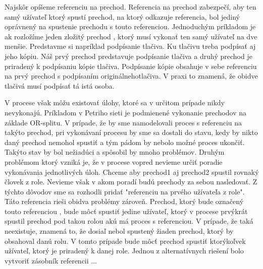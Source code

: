 Najskôr opíšeme referenciu na prechod. Referencia na prechod zabezpečí, aby ten samý užívateľ ktorý spustí prechod, na ktorý odkazuje referencia, bol jediný oprávnený na spustenie prechodu s touto referenciou. Jednoduchým príkladom je ak rozložíme jeden zložitý prechod , ktorý musí vykonať ten samý užívateľ na dve menšie. Predstavme si napríklad podpísanie tlačiva. Ku tlačivu treba podpísať aj jeho kópiu. Náš prvý prechod predstavuje podpísanie tlačiva a druhý prechod je priradený k podpísaniu kópie tlačiva. Podpísanie kópie obsahuje v sebe referenciu na prvý prechod s podpísaním originálnehotlačiva. V praxi to znamená, že obidve tlačivá musí podpísať tá istá osoba. 


V procese však môžu existovať úlohy, ktoré sa v určitom prípade nikdy nevykonajú. Príkladom v Petriho sieti je podmienené vykonanie prechodov na základe OR-splitu. V prípade, že by sme namodelovali proces s referenciu na takýto prechod, pri vykonávaní procesu by sme sa dostali do stavu, kedy by nikto daný prechod nemohol spustiť a tým pádom by nebolo možné proces ukončiť. Takýto stav by bol nežiadúci a spôsobil by mnoho problémov. Druhým problémom ktorý vzniká je, že v procese vopred nevieme určiť poradie vykonávania jednotlivých úloh. Chceme aby prechod1 aj prechod2 spustil rovnaký človek z role. Nevieme však v akom poradí budú prechody za sebou nasledovať. Z týchto dôvodov sme sa rozhodli pridať "referenciu na prvého užívateľa z role". Táto referencia rieši obidva problémy zároveň. Prechod, ktorý bude označený touto referenciou , bude môcť spustiť jedine užívateľ, ktorý v procese prvýkrát spustil prechod pod takou rolou akú má proces s referenciou. V prípade, že taká neexistuje, znamená to, že dosiaľ nebol spustený žiaden prechod, ktorý by obsahoval danú rolu. V tomto prípade bude môcť prechod spustiť ktorýkoľvek užívateľ, ktorý je priradený k danej role. Jednou z alternatívnych riešení bolo vytvoriť zásobník referencii ...



